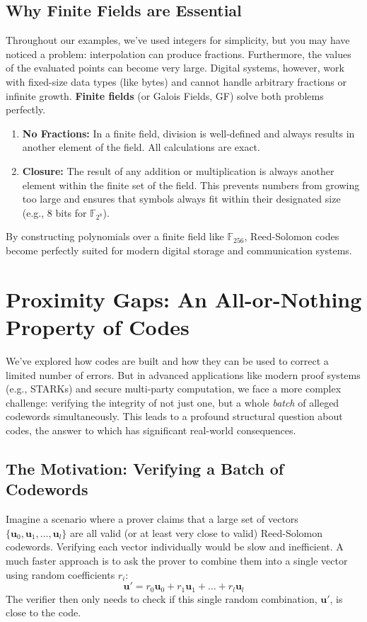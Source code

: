 \documentclass{article}
\begin{document}
\subsection{Why Finite Fields are Essential}
Throughout our examples, we've used integers for simplicity, but you may have noticed a problem: interpolation can produce fractions. Furthermore, the values of the evaluated points can become very large. Digital systems, however, work with fixed-size data types (like bytes) and cannot handle arbitrary fractions or infinite growth. \textbf{Finite fields} (or Galois Fields, GF) solve both problems perfectly.
\begin{enumerate}
    \item \textbf{No Fractions:} In a finite field, division is well-defined and always results in another element of the field. All calculations are exact.
    \item \textbf{Closure:} The result of any addition or multiplication is always another element within the finite set of the field. This prevents numbers from growing too large and ensures that symbols always fit within their designated size (e.g., 8 bits for $\mathbb{F}_{2^8}$).
\end{enumerate}
By constructing polynomials over a finite field like $\mathbb{F}_{256}$, Reed-Solomon codes become perfectly suited for modern digital storage and communication systems.




\section{Proximity Gaps: An All-or-Nothing Property of Codes}

We've explored how codes are built and how they can be used to correct a limited number of errors. But in advanced applications like modern proof systems (e.g., STARKs) and secure multi-party computation, we face a more complex challenge: verifying the integrity of not just one, but a whole \textit{batch} of alleged codewords simultaneously. This leads to a profound structural question about codes, the answer to which has significant real-world consequences.

\subsection{The Motivation: Verifying a Batch of Codewords}
Imagine a scenario where a prover claims that a large set of vectors $\{ \mathbf{u}_0, \mathbf{u}_1, \dots, \mathbf{u}_l \}$ are all valid (or at least very close to valid) Reed-Solomon codewords. Verifying each vector individually would be slow and inefficient. A much faster approach is to ask the prover to combine them into a single vector using random coefficients $r_i$:
\[ \mathbf{u}' = r_0\mathbf{u}_0 + r_1\mathbf{u}_1 + \dots + r_l\mathbf{u}_l \]
The verifier then only needs to check if this single random combination, $\mathbf{u}'$, is close to the code.
\end{document}
